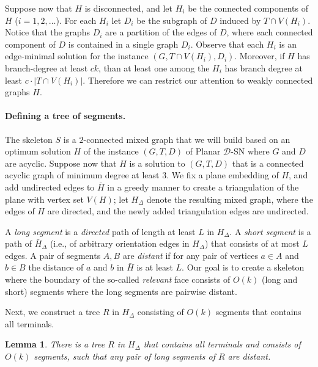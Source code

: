 \documentclass[a4paper,11pt]{article}
\newcommand{\calD}{\mathcal{D}}
\theoremstyle{plain}
\newtheorem{lemma}[theorem]{Lemma}
\newtheorem{identification rule}{Identification Rule}
\theoremstyle{definition}
\theoremstyle{remark}
\newcommand{\Dsn}{{\sc Planar $\calD$-SN}\xspace}
\begin{document}
Suppose now that $H$ is disconnected, and let $H_i$ be the connected components of $H$ ($i=1,2,\dots$). For each $H_i$ let $D_i$ be the subgraph of $D$ induced by $T\cap V(H_i)$. Notice that the graphs $D_i$ are a partition of the edges of $D$, where each connected component of $D$ is contained in a single graph $D_i$. Observe that each $H_i$ is an edge-minimal solution for the instance $(G,T\cap V(H_i), D_i)$. Moreover, if $H$ has branch-degree at least $ck$, than at least one among the $H_i$ has branch degree at least $c\cdot|T\cap V(H_i)|$. Therefore we can restrict our attention to weakly connected graphs $H$.


\paragraph*{Defining a tree of segments.}
The skeleton $S$ is a $2$-connected mixed graph that we will build based on an optimum solution $H$ of the instance $(G,T,D)$ of \Dsn where $G$ and $D$ are acyclic.
Suppose now that $H$ is a solution to $(G,T,D)$ that is a connected acyclic graph of minimum degree at least $3$.
We fix a plane embedding of $H$, and add undirected edges to $\bar{H}$ in a greedy manner to create a triangulation of the plane with vertex set $V(H)$; let $H_\Delta$ denote the resulting mixed graph, where the edges of $H$ are directed, and the newly added triangulation edges are undirected.

A \emph{long segment} is a \emph{directed} path of length at least $L$ in $H_\Delta$. A \emph{short segment} is a path of $\bar{H}_\Delta$ (i.e., of arbitrary orientation edges in $H_\Delta$) that consists of at most $L$ edges. A pair of segments $A,B$ are \emph{distant} if for any pair of vertices $a\in A$ and $b\in B$ the distance of $a$ and $b$ in $\bar{H}$ is at least $L$. Our goal is to create a skeleton where the boundary of the so-called \emph{relevant} face consists of $O(k)$ (long and short) segments where the long segments are pairwise distant.

Next, we construct a tree $R$ in $H_\Delta$ consisting of $O(k)$ segments that contains all terminals.

\begin{lemma}\label{lem:maketree}
There is a tree $R$ in $H_\Delta$ that contains all terminals and consists of $O(k)$ segments, such that any pair of long segments of $R$ are distant.
\end{lemma}
\end{document}
